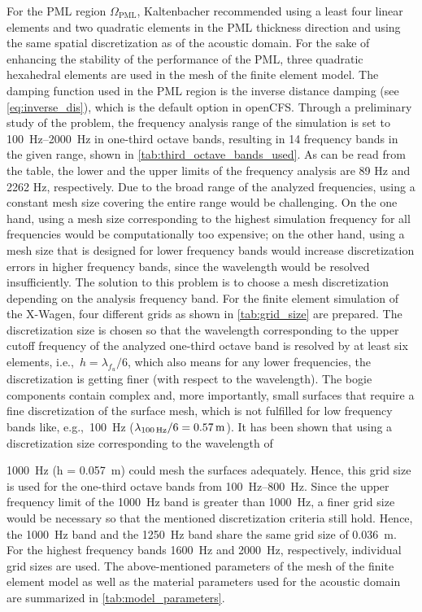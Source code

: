 For the PML region $\Omega_{\text{PML}}$, Kaltenbacher \cite{KALTENBACHER_PML_2013} recommended using a least four linear elements and two quadratic elements in the PML thickness direction and using the same spatial discretization as of the acoustic domain. For the sake of enhancing the stability of the performance of the PML, three quadratic hexahedral elements are used in the mesh of the finite element model. The damping function used in the PML region is the inverse distance damping (see \cref{eq:inverse_dis}), which is the default option in openCFS.
Through a preliminary study of the problem, the frequency analysis range of the simulation is set to \SIrange{100}{2000}{\hertz} in one-third octave bands, resulting in 14 frequency bands in the given range, shown in \cref{tab:third_octave_bands_used}. As can be read from the table, the lower and the upper limits of the frequency analysis are 89 Hz and 2262 Hz, respectively. Due to the broad range of the analyzed frequencies, using a constant mesh size covering the entire range would be challenging. On the one hand, using a mesh size corresponding to the highest simulation frequency for all frequencies would be computationally too expensive; on the other hand, using a mesh size that is designed for lower frequency bands would increase discretization errors in higher frequency bands, since the wavelength would be resolved insufficiently. The solution to this problem is to choose a mesh discretization depending on the analysis frequency band. For the finite element simulation of the X-Wagen, four different grids as shown in \cref{tab:grid_size} are prepared. The discretization size is chosen so that the wavelength corresponding to the upper cutoff frequency of the analyzed one-third octave band is resolved by at least six elements, i.e.,\ $h = \lambda_{f_u} / 6$, which also means for any lower frequencies, the discretization is getting finer (with respect to the wavelength). The bogie components contain complex and, more importantly, small surfaces that require a fine discretization of the surface mesh, which is not fulfilled for low frequency bands like, e.g.,\ \SI{100}{\hertz} ($\lambda_{\text{\SI{100}{\hertz}}} / 6 = 0.57\,\text{m}$). It has been shown that using a discretization size corresponding to the wavelength of {\SI{1000}{\hertz} (h = \SI{0.057}{\meter}) could mesh the surfaces adequately. Hence, this grid size is used for the one-third octave bands from \SIrange{100}{800}{\hertz}. Since the upper frequency limit of the \SI{1000}{\hertz} band is greater than \SI{1000}{\hertz}, a finer grid size would be necessary so that the mentioned discretization criteria still hold. Hence, the \SI{1000}{\hertz} band and the \SI{1250}{\hertz} band share the same grid size of \SI{0.036}{\meter}. For the highest frequency bands \SI{1600}{\hertz} and \SI{2000}{\hertz}, respectively, individual grid sizes are used.
The above-mentioned parameters of the mesh of the finite element model as well as the material parameters used for the acoustic domain are summarized in \cref{tab:model_parameters}.

}

